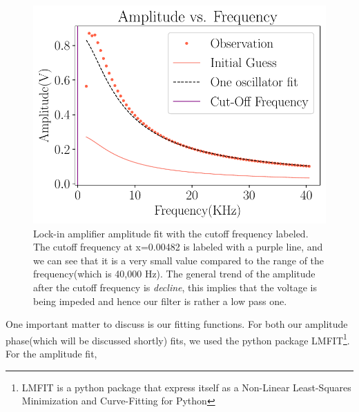 \documentclass[twocolumn]{article}\usepackage[english]{babel}
\begin{document}
\begin{figure}
\includegraphics[width=\linewidth]{images/v2/Cut Off LA - Amplitude Fit.pdf}
\caption{Lock-in amplifier amplitude fit with the cutoff frequency labeled. The cutoff frequency at x=0.00482 is labeled with a purple line, and we can see that it is a very small value compared to the range of the frequency(which is 40,000 Hz). The general trend of the amplitude after the cutoff frequency is \textit{decline}, this implies that the voltage is being impeded and hence our filter is rather a low pass one. }
  \label{fig:CutOff LA Ampt fit}
\end{figure}
One important matter to discuss is our fitting functions. For both our amplitude phase(which will be discussed shortly) fits, we used the python package LMFIT\footnote{LMFIT is a python package that express itself as a Non-Linear Least-Squares Minimization and Curve-Fitting for Python}. For the amplitude fit, 
\end{document}
